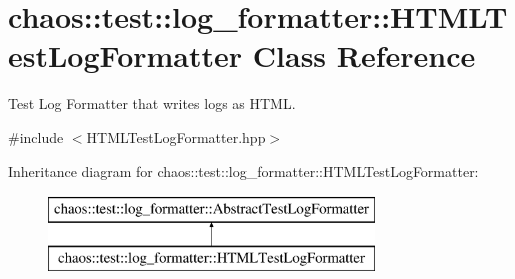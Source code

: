 \hypertarget{classchaos_1_1test_1_1log__formatter_1_1_h_t_m_l_test_log_formatter}{\section{chaos\-:\-:test\-:\-:log\-\_\-formatter\-:\-:H\-T\-M\-L\-Test\-Log\-Formatter Class Reference}
\label{classchaos_1_1test_1_1log__formatter_1_1_h_t_m_l_test_log_formatter}
}


Test Log Formatter that writes logs as H\-T\-M\-L.  




{\ttfamily \#include $<$H\-T\-M\-L\-Test\-Log\-Formatter.\-hpp$>$}

Inheritance diagram for chaos\-:\-:test\-:\-:log\-\_\-formatter\-:\-:H\-T\-M\-L\-Test\-Log\-Formatter\-:\begin{figure}[H]
\begin{center}
\leavevmode
\includegraphics[height=2.000000cm]{classchaos_1_1test_1_1log__formatter_1_1_h_t_m_l_test_log_formatter}
\end{center}
\end{figure}
